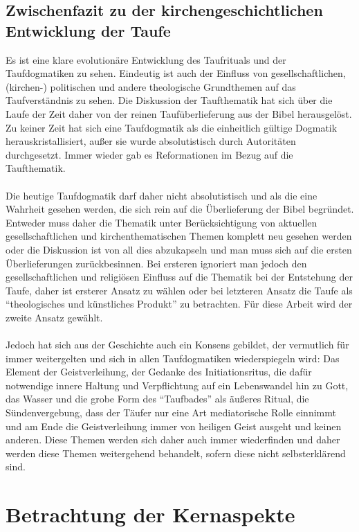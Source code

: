\subsection{Zwischenfazit zu der kirchengeschichtlichen Entwicklung der Taufe}
Es ist eine klare evolutionäre Entwicklung des Taufrituals und der Taufdogmatiken zu sehen. Eindeutig ist auch
der Einfluss von gesellschaftlichen, (kirchen-) politischen und andere theologische Grundthemen auf das Taufverständnis zu sehen.
Die Diskussion der Taufthematik hat sich über die Laufe der Zeit daher von der reinen Taufüberlieferung aus der Bibel
herausgelöst. Zu keiner Zeit hat sich eine Taufdogmatik als die einheitlich gültige Dogmatik herauskristallisiert, außer sie wurde
absolutistisch durch Autoritäten durchgesetzt. Immer wieder gab es Reformationen im Bezug auf die Taufthematik.
\\~\\
\newpage
Die heutige Taufdogmatik  darf daher nicht absolutistisch und als die eine Wahrheit gesehen werden, die sich rein auf die Überlieferung der Bibel begründet. Entweder muss daher die Thematik unter Berücksichtigung von aktuellen gesellschaftlichen und kirchenthematischen Themen komplett neu gesehen werden oder die Diskussion ist von all dies abzukapseln und man muss sich auf die ersten Überlieferungen zurückbesinnen. Bei ersteren ignoriert man jedoch den gesellschaftlichen und religiösen Einfluss auf die Thematik bei der Entstehung der Taufe, daher ist ersterer Ansatz zu wählen oder bei letzteren Ansatz die Taufe als ``theologisches und künstliches Produkt'' zu betrachten. Für diese Arbeit wird der zweite Ansatz gewählt.
\\~\\
Jedoch hat sich aus der Geschichte auch ein Konsens gebildet, der vermutlich für immer weitergelten und sich in allen Taufdogmatiken wiederspiegeln wird: Das Element der Geistverleihung, der Gedanke des Initiationsritus, die dafür notwendige innere Haltung und Verpflichtung auf ein Lebenswandel hin zu Gott, das Wasser und die grobe Form des ``Taufbades'' als äußeres Ritual, die Sündenvergebung, dass der Täufer nur eine Art mediatorische Rolle einnimmt und am Ende die Geistverleihung immer von heiligen Geist ausgeht und keinen anderen. Diese Themen werden sich daher auch immer wiederfinden und daher werden diese Themen weitergehend behandelt, sofern diese nicht selbsterklärend sind.


\section{Betrachtung der Kernaspekte}
